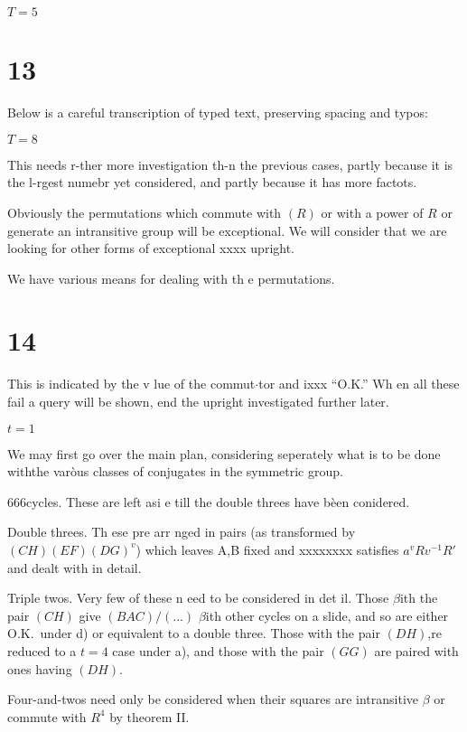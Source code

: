 \documentclass[12pt]{article}
\begin{document}
\bigskip

\(T = 5\)

\section{13}

Below is a careful transcription of typed text, preserving spacing and typos:

\bigskip

\noindent
\(T = 8\)

This needs r-ther more investigation th-n the previous
cases, partly because it is the l-rgest numebr yet considered,
and partly because it has more factots.

Obviously the permutations which commute with \((R)\) or with
a power of \(R\) or generate an intransitive group will be
exceptional. We will consider that we are looking for other
forms of exceptional xxxx upright.

We have various means for dealing with th e permutations.

\section{14}

\noindent
This is indicated by the v lue of the commut\(\cdot\)tor and ixxx ``O.K.''
Wh en all these fail a query will be shown, end the upright
investigated further later.

\(t = 1\)

We may first go over the main plan, considering seperately
what is to be done withthe var\`{o}us classes of conjugates in
the symmetric group.

666cycles. These are left asi e till the double threes
have b\`{e}en conidered.

Double threes. Th ese pre arr nged in pairs (as transformed
by \((CH)(EF)(DG)^v\)) which leaves A,B fixed and xxxxxxxx
satisfies \(a^v R v^{-1} R'\) and dealt with in detail.

Triple twos. Very few of these n eed to be considered in
det il. Those \(\beta\)ith the pair \((CH)\) give \((BAC)/(...)\) \(\beta\)ith other cycles
on a slide, and so are either O.K.\ under d) or equivalent to
a double three. Those with the pair \((DH)\),re reduced to a
\(t=4\) case under a), and those with the pair \((GG)\) are paired with
ones having \((DH)\).

Four-and-twos need only be considered when their squares are
intransitive \(\beta\) or commute with \(R^4\) by theorem II.
\end{document}

